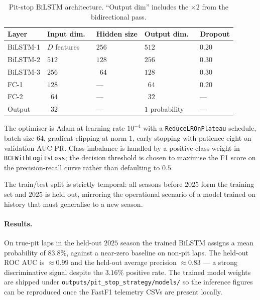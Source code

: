 \documentclass[11pt,a4paper]{article}
\newcommand{\code}[1]{\texttt{\small #1}}
\theoremstyle{remark}
\begin{document}
\begin{table}[H]
  \centering
  \caption{Pit-stop BiLSTM architecture. ``Output dim'' includes the
  $\times 2$ from the bidirectional pass.}
  \label{tab:bilstm-arch}
  \small
  \begin{tabular}{lllll}
    \toprule
    Layer & Input dim.\ & Hidden size & Output dim.\ & Dropout \\
    \midrule
    BiLSTM-1 & $D$ features & $256$ & $512$           & $0.20$ \\
    BiLSTM-2 & $512$        & $128$ & $256$           & $0.30$ \\
    BiLSTM-3 & $256$        & $\phantom{0}64$ & $128$ & $0.30$ \\
    FC-1     & $128$        & ---   & $\phantom{0}64$ & $0.20$ \\
    FC-2     & $\phantom{0}64$ & --- & $\phantom{0}32$ & --- \\
    Output   & $\phantom{0}32$ & --- & $1$ probability & --- \\
    \bottomrule
  \end{tabular}
\end{table}

The optimiser is Adam at learning rate $10^{-4}$ with a
\code{ReduceLROnPlateau} schedule, batch size $64$, gradient
clipping at norm $1$, early stopping with patience eight on
validation AUC-PR. Class imbalance is handled by a positive-class
weight in \code{BCEWithLogitsLoss}; the decision threshold is chosen
to maximise the F1 score on the precision-recall curve rather than
defaulting to $0.5$.

The train/test split is strictly temporal: all seasons before $2025$
form the training set and $2025$ is held out, mirroring the
operational scenario of a model trained on history that must
generalise to a new season.

\paragraph{Results.}
On true-pit laps in the held-out $2025$ season the trained BiLSTM
assigns a mean probability of $83.8\%$, against a near-zero baseline
on non-pit laps. The held-out ROC AUC is $\approx 0.99$ and the
held-out average precision $\approx 0.83$ --- a strong discriminative
signal despite the $3.16\%$ positive rate. The trained model weights
are shipped under \code{outputs/pit\_stop\_strategy/models/} so the
inference figures can be reproduced once the FastF1 telemetry CSVs
are present locally.
\end{document}
